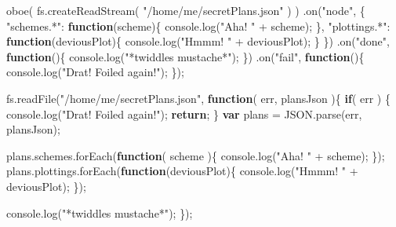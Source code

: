 \documentclass[12pt, ]{article}
\newenvironment{Shaded}{}{}
\newcommand{\KeywordTok}[1]{\textcolor[rgb]{0.00,0.44,0.13}{\textbf{{#1}}}}
\newcommand{\StringTok}[1]{\textcolor[rgb]{0.25,0.44,0.63}{{#1}}}
\newcommand{\OtherTok}[1]{\textcolor[rgb]{0.00,0.44,0.13}{{#1}}}
\newcommand{\FunctionTok}[1]{\textcolor[rgb]{0.02,0.16,0.49}{{#1}}}
\newcommand{\NormalTok}[1]{{#1}}
\begin{document}
\begin{Shaded}
\begin{Highlighting}[]
\FunctionTok{oboe}\NormalTok{( }\OtherTok{fs}\NormalTok{.}\FunctionTok{createReadStream}\NormalTok{( }\StringTok{"/home/me/secretPlans.json"} \NormalTok{) )}
   \NormalTok{.}\FunctionTok{on}\NormalTok{(}\StringTok{"node"}\NormalTok{, \{}
      \StringTok{"schemes.*"}\NormalTok{: }\KeywordTok{function}\NormalTok{(scheme)\{}
         \OtherTok{console}\NormalTok{.}\FunctionTok{log}\NormalTok{(}\StringTok{"Aha! "} \NormalTok{+ scheme);}
      \NormalTok{\},}
      \StringTok{"plottings.*"}\NormalTok{: }\KeywordTok{function}\NormalTok{(deviousPlot)\{}
         \OtherTok{console}\NormalTok{.}\FunctionTok{log}\NormalTok{(}\StringTok{"Hmmm! "} \NormalTok{+ deviousPlot);}
      \NormalTok{\}   }
   \NormalTok{\})}
   \NormalTok{.}\FunctionTok{on}\NormalTok{(}\StringTok{"done"}\NormalTok{, }\KeywordTok{function}\NormalTok{()\{}
      \OtherTok{console}\NormalTok{.}\FunctionTok{log}\NormalTok{(}\StringTok{"*twiddles mustache*"}\NormalTok{);}
   \NormalTok{\})}
   \NormalTok{.}\FunctionTok{on}\NormalTok{(}\StringTok{"fail"}\NormalTok{, }\KeywordTok{function}\NormalTok{()\{}
      \OtherTok{console}\NormalTok{.}\FunctionTok{log}\NormalTok{(}\StringTok{"Drat! Foiled again!"}\NormalTok{);   }
   \NormalTok{\});}
\end{Highlighting}
\end{Shaded}

\begin{Shaded}
\begin{Highlighting}[]
\OtherTok{fs}\NormalTok{.}\FunctionTok{readFile}\NormalTok{(}\StringTok{"/home/me/secretPlans.json"}\NormalTok{, }\KeywordTok{function}\NormalTok{( err, plansJson )\{     }
   \KeywordTok{if}\NormalTok{( err ) \{}
      \OtherTok{console}\NormalTok{.}\FunctionTok{log}\NormalTok{(}\StringTok{"Drat! Foiled again!"}\NormalTok{);}
      \KeywordTok{return}\NormalTok{;}
   \NormalTok{\}}
   \KeywordTok{var} \NormalTok{plans = }\OtherTok{JSON}\NormalTok{.}\FunctionTok{parse}\NormalTok{(err, plansJson);}
   
   \OtherTok{plans}\NormalTok{.}\OtherTok{schemes}\NormalTok{.}\FunctionTok{forEach}\NormalTok{(}\KeywordTok{function}\NormalTok{( scheme )\{}
      \OtherTok{console}\NormalTok{.}\FunctionTok{log}\NormalTok{(}\StringTok{"Aha! "} \NormalTok{+ scheme);   }
   \NormalTok{\});   }
   \OtherTok{plans}\NormalTok{.}\OtherTok{plottings}\NormalTok{.}\FunctionTok{forEach}\NormalTok{(}\KeywordTok{function}\NormalTok{(deviousPlot)\{}
      \OtherTok{console}\NormalTok{.}\FunctionTok{log}\NormalTok{(}\StringTok{"Hmmm! "} \NormalTok{+ deviousPlot);}
   \NormalTok{\});}
      
   \OtherTok{console}\NormalTok{.}\FunctionTok{log}\NormalTok{(}\StringTok{"*twiddles mustache*"}\NormalTok{);   }
\NormalTok{\});}
\end{Highlighting}
\end{Shaded}
\end{document}
